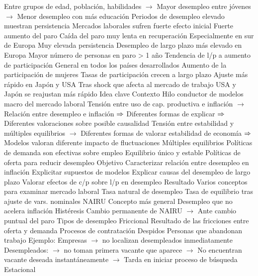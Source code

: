 \documentclass{nuevotema}
\begin{document}
\begin{esquemal}
				\4[] Entre grupos de edad, población, habilidades
				\4[] $\to$ Mayor desempleo entre jóvenes
				\4[] $\to$ Menor desempleo con más educación
			\3 Periodos de desempleo elevado muestran persistencia
				\4 Mercados laborales sufren fuerte efecto inicial
				\4[] Fuerte aumento del paro
				\4 Caída del paro muy lenta en recuperación
				\4[] Especialmente en sur de Europa
				\4[] Muy elevada persistencia
			\3 Desempleo de largo plazo más elevado en Europa
				\4 Mayor número de personas en paro > 1 año
			\3 Tendencia de l/p a aumento de participación
				\4 General en todos los países desarrollados
			\3 Aumento de la participación de mujeres
				\4 Tasas de participación crecen a largo plazo
			\3 Ajuste más rápido en Japón y USA
				\4 Tras shock que afecta al mercado de trabajo
				\4[] USA y Japón se reajustan más rápido
	\1 
		\2 Idea clave
			\3 Contexto
				\4 Hilo conductor de modelos macro del mercado laboral
				\4[] Tensión entre uso de cap. productiva e inflación
				\4[] $\to$ Relación entre desempleo e inflación
				\4[] $\Rightarrow$ Diferentes formas de explicar
				\4[] $\Rightarrow$ Diferentes valoraciones sobre posible causalidad
				\4[] Tensión entre estabilidad y múltiples equilibrios
				\4[] $\to$ Diferentes formas de valorar estabilidad de economía
				\4[] $\Rightarrow$ Modelos valoran diferente impacto de fluctuaciones
				\4 Múltiples equilibrios
				\4[] Políticas de demanda son efectivas sobre empleo
				\4 Equilibrio único y estable
				\4[] Políticas de oferta para reducir desempleo
			\3 Objetivo
				\4 Caracterizar relación entre desempleo en inflación
				\4 Explicitar supuestos de modelos
				\4 Explicar causas del desempleo de largo plazo
				\4 Valorar efectos de c/p sobre l/p en desempleo
			\3 Resultado
				\4 Varios conceptos para examinar mercado laboral
				\4 Tasa natural de desempleo
				\4[] Tasa de equilibrio tras ajuste de vars. nominales
				\4 NAIRU
				\4[] Concepto más general
				\4[] Desempleo que no acelera inflación
				\4 Histéresis
				\4[] Cambio permanente de NAIRU
				\4[] $\to$ Ante cambio puntual del paro
		\2 Tipos de desempleo
			\3 Friccional
				\4 Resultado de las fricciones entre oferta y demanda
				\4[] Procesos de contratación
				\4[] Despidos
				\4[] Personas que abandonan trabajo
				\4 Ejemplo:
				\4[] Empresas
				\4[] $\to$ no localizan desempleados inmediatamente
				\4[] Desempleados:
				\4[] $\to$ no toman primera vacante que aparece
				\4[] $\to$ No encuentran vacante deseada instantáneamente
				\4[] $\to$ Tarda en iniciar proceso de búsqueda
			\3 Estacional

\end{esquemal}
\end{document}

